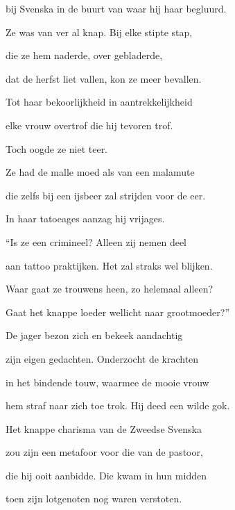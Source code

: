 bij Svenska in de buurt
van waar hij haar begluurd.

Ze was van ver al knap.
Bij elke stipte stap,

die ze hem naderde,
over gebladerde,

dat de herfst liet vallen,
kon ze meer bevallen.

Tot haar bekoorlijkheid
in aantrekkelijkheid

elke vrouw overtrof
die hij tevoren trof.

Toch oogde ze niet teer.

Ze had de malle moed
als van een malamute

die zelfs bij een ijsbeer
zal strijden voor de eer.

In haar tatoeages
aanzag hij vrijages.

“Is ze een crimineel?
Alleen zij nemen deel

aan tattoo praktijken.
Het zal straks wel blijken.

Waar gaat ze trouwens heen,
zo helemaal alleen?

Gaat het knappe loeder
wellicht naar grootmoeder?”

De jager bezon zich
en bekeek aandachtig

zijn eigen gedachten.
Onderzocht de krachten

in het bindende touw,
waarmee de mooie vrouw

hem straf naar zich toe trok.
Hij deed een wilde gok.

Het knappe charisma
van de Zweedse Svenska

zou zijn een metafoor
voor die van de pastoor,

die hij ooit aanbidde.
Die kwam in hun midden

toen zijn lotgenoten
nog waren verstoten.
